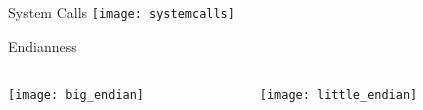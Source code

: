 \documentclass[beamer]{uibk}
\begin{document}
\begin{frame}{System Calls}
    \texttt{[image: systemcalls]}
\end{frame}

\begin{frame}{Endianness}
    \begin{columns}
        \begin{column}{0.5\textwidth}
            \begin{center}
                \texttt{[image: big\_endian]}
            \end{center}
        \end{column}
        \begin{column}{0.5\textwidth}
            \begin{center}
                \texttt{[image: little\_endian]}
            \end{center}
        \end{column}
    \end{columns}
\end{frame}
\end{document}
